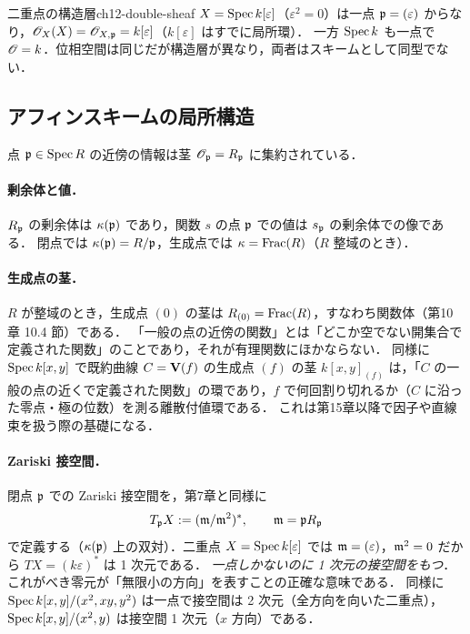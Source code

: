 \begin{myex}{二重点の構造層}{ch12-double-sheaf}
$X=\operatorname{Spec} k[\varepsilon]$（$\varepsilon^2=0$）は一点 $\mathfrak{p}=(\varepsilon)$ からなり，$\mathscr{O}_X(X)=\mathscr{O}_{X,\mathfrak{p}}=k[\varepsilon]$（$k[\varepsilon]$ はすでに局所環）．
一方 $\operatorname{Spec} k$ も一点で $\mathscr{O}=k$．位相空間は同じだが構造層が異なり，両者はスキームとして同型でない．
\end{myex}

\subsection{アフィンスキームの局所構造}

点 $\mathfrak{p}\in\operatorname{Spec} R$ の近傍の情報は茎 $\mathscr{O}_{\mathfrak{p}}=R_{\mathfrak{p}}$ に集約されている．

\paragraph{剰余体と値．}
$R_{\mathfrak{p}}$ の剰余体は $\kappa(\mathfrak{p})$ であり，関数 $s$ の点 $\mathfrak{p}$ での値は $s_{\mathfrak{p}}$ の剰余体での像である．
閉点では $\kappa(\mathfrak{p})=R/\mathfrak{p}$，生成点では $\kappa=\operatorname{Frac}(R)$（$R$ 整域のとき）．

\paragraph{生成点の茎．}
$R$ が整域のとき，生成点 $(0)$ の茎は $R_{(0)}=\operatorname{Frac}(R)$，すなわち関数体（第10章 10.4 節）である．
「一般の点の近傍の関数」とは「どこか空でない開集合で定義された関数」のことであり，それが有理関数にほかならない．
同様に $\operatorname{Spec} k[x,y]$ で既約曲線 $C=\mathbf{V}(f)$ の生成点 $(f)$ の茎 $k[x,y]_{(f)}$ は，「$C$ の一般の点の近くで定義された関数」の環であり，$f$ で何回割り切れるか（$C$ に沿った零点・極の位数）を測る離散付値環である．
これは第15章以降で因子や直線束を扱う際の基礎になる．

\paragraph{Zariski 接空間．}
閉点 $\mathfrak{p}$ での Zariski 接空間を，第7章と同様に
\[
  T_{\mathfrak{p}} X := (\mathfrak{m}/\mathfrak{m}^2)^*,\qquad \mathfrak{m}=\mathfrak{p} R_{\mathfrak{p}}
\]
で定義する（$\kappa(\mathfrak{p})$ 上の双対）．二重点 $X=\operatorname{Spec} k[\varepsilon]$ では $\mathfrak{m}=(\varepsilon)$，$\mathfrak{m}^2=0$ だから $T X=(k\varepsilon)^*$ は 1 次元である．
\emph{一点しかないのに 1 次元の接空間をもつ}．これがべき零元が「無限小の方向」を表すことの正確な意味である．
同様に $\operatorname{Spec} k[x,y]/(x^2,xy,y^2)$ は一点で接空間は 2 次元（全方向を向いた二重点），$\operatorname{Spec} k[x,y]/(x^2,y)$ は接空間 1 次元（$x$ 方向）である．

